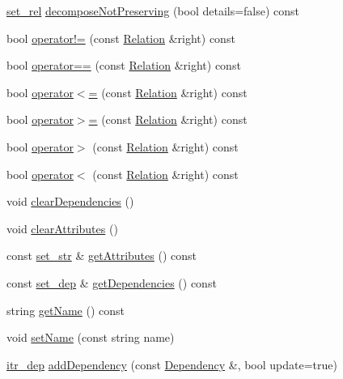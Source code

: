 \begin{DoxyCompactItemize}
\item 
\hyperlink{typedef_8h_ae4f64e726e10cd561d68b42cf3a43e94}{set\+\_\+rel} \hyperlink{class_relation_af01e5bab69f13b1e1b80526de5594b0f}{decompose\+Not\+Preserving} (bool details=false) const 
\item 
bool \hyperlink{class_relation_af3c884586ee349da4f3c3e9a55d94f97}{operator!=} (const \hyperlink{class_relation}{Relation} \&right) const 
\item 
bool \hyperlink{class_relation_a7a4c2acb958780bbf6fc5a52a456a9f6}{operator==} (const \hyperlink{class_relation}{Relation} \&right) const 
\item 
bool \hyperlink{class_relation_aaceeb923c5623a9f22cfb3f161b8a26c}{operator$<$=} (const \hyperlink{class_relation}{Relation} \&right) const 
\item 
bool \hyperlink{class_relation_a3c7507f98a726b72f921f6ec940a0a3f}{operator$>$=} (const \hyperlink{class_relation}{Relation} \&right) const 
\item 
bool \hyperlink{class_relation_a6a234c8dfd0875f60b22799c587d46e0}{operator$>$} (const \hyperlink{class_relation}{Relation} \&right) const 
\item 
bool \hyperlink{class_relation_af5dc18e0b5cb8937f87f1cb8593192e3}{operator$<$} (const \hyperlink{class_relation}{Relation} \&right) const 
\item 
void \hyperlink{class_relation_a3c7aa8f1df884462856e4a1b4e05658b}{clear\+Dependencies} ()
\item 
void \hyperlink{class_relation_ad2ac1a5f21fad67ea0d1370d653e2d67}{clear\+Attributes} ()
\item 
const \hyperlink{typedef_8h_aa234bdb39b1698c1d4955072cfb3195f}{set\+\_\+str} \& \hyperlink{class_relation_aaed04d808db08b522023c833c31b87ea}{get\+Attributes} () const 
\item 
const \hyperlink{typedef_8h_a49fdcf14d2faf54629fca98482b2dfb9}{set\+\_\+dep} \& \hyperlink{class_relation_a569838107aebf43367d9c2c0dbc0d359}{get\+Dependencies} () const 
\item 
string \hyperlink{class_relation_a3f2630997cefbc28c0abce228033fe92}{get\+Name} () const 
\item 
void \hyperlink{class_relation_ae98924c3d4ddf1e19a23403fcb35afe0}{set\+Name} (const string name)
\item 
\hyperlink{typedef_8h_ab78cecb3657d8a4377c1f9e4dba8778c}{itr\+\_\+dep} \hyperlink{class_relation_ac1d9a658374a2e84f82e117949b0a2a2}{add\+Dependency} (const \hyperlink{class_dependency}{Dependency} \&, bool update=true)
\end{DoxyCompactItemize}

